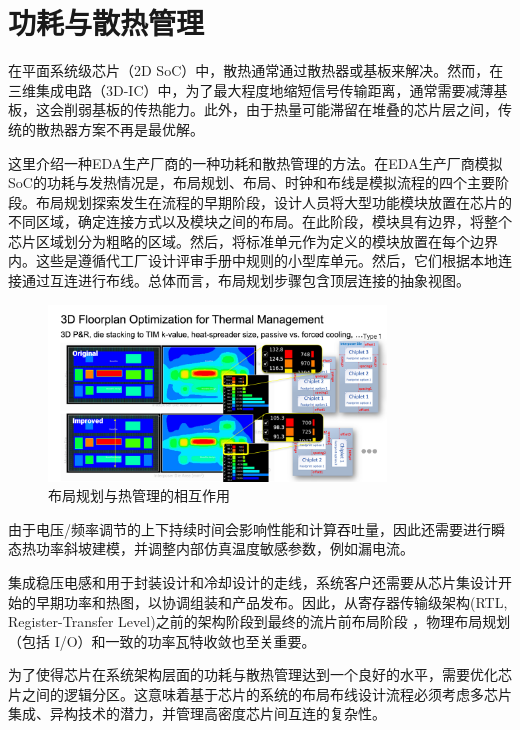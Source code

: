 \section{功耗与散热管理}

在平面系统级芯片（2D SoC）中，散热通常通过散热器或基板来解决。然而，在三维集成电路（3D-IC）中，为了最大程度地缩短信号传输距离，通常需要减薄基板，这会削弱基板的传热能力。此外，由于热量可能滞留在堆叠的芯片层之间，传统的散热器方案不再是最优解。



这里介绍一种EDA生产厂商的一种功耗和散热管理的方法。在EDA生产厂商模拟SoC的功耗与发热情况是，布局规划、布局、时钟和布线是模拟流程的四个主要阶段。布局规划探索发生在流程的早期阶段，设计人员将大型功能模块放置在芯片的不同区域，确定连接方式以及模块之间的布局。在此阶段，模块具有边界，将整个芯片区域划分为粗略的区域。然后，将标准单元作为定义的模块放置在每个边界内。这些是遵循代工厂设计评审手册中规则的小型库单元。然后，它们根据本地连接通过互连进行布线。总体而言，布局规划步骤包含顶层连接的抽象视图。

\begin{figure}[htbp]
	\centering
	\includegraphics[width=0.8\textwidth]{img/5-1.png} %
	\caption{布局规划与热管理的相互作用 \cite{Heyman2024FloorPlanning}}
	\label{fig:example}
\end{figure}

由于电压/频率调节的上下持续时间会影响性能和计算吞吐量，因此还需要进行瞬态热功率斜坡建模，并调整内部仿真温度敏感参数，例如漏电流。

集成稳压电感和用于封装设计和冷却设计的走线，系统客户还需要从芯片集设计开始的早期功率和热图，以协调组装和产品发布。因此，从寄存器传输级架构(RTL, Register-Transfer Level)之前的架构阶段到最终的流片前布局阶段 \cite{11074799}，物理布局规划（包括 I/O）和一致的功率瓦特收敛也至关重要。

为了使得芯片在系统架构层面的功耗与散热管理达到一个良好的水平，需要优化芯片之间的逻辑分区。这意味着基于芯片的系统的布局布线设计流程必须考虑多芯片集成、异构技术的潜力，并管理高密度芯片间互连的复杂性。

